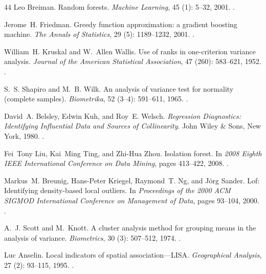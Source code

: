 \documentclass[11pt, letterpaper]{article}
\begin{document}
\begin{thebibliography}{44}
Leo Breiman.
\newblock Random forests.
\newblock \emph{Machine Learning}, 45 (1): 5--32, 2001.
\newblock {}.

Jerome~H. Friedman.
\newblock Greedy function approximation: a gradient boosting machine.
\newblock \emph{The Annals of Statistics}, 29 (5): 1189--1232, 2001.
\newblock {}.

William~H. Kruskal and W.~Allen Wallis.
\newblock Use of ranks in one-criterion variance analysis.
\newblock \emph{Journal of the American Statistical Association}, 47 (260): 583--621, 1952.
\newblock {}.

S.~S. Shapiro and M.~B. Wilk.
\newblock An analysis of variance test for normality (complete samples).
\newblock \emph{Biometrika}, 52 (3--4): 591--611, 1965.
\newblock {}.

David~A. Belsley, Edwin Kuh, and Roy~E. Welsch.
\newblock \emph{Regression Diagnostics: Identifying Influential Data and Sources of Collinearity}.
\newblock John Wiley \& Sons, New York, 1980.
\newblock {}.

Fei~Tony Liu, Kai~Ming Ting, and Zhi-Hua Zhou.
\newblock Isolation forest.
\newblock In \emph{2008 Eighth IEEE International Conference on Data Mining}, pages 413--422, 2008.
\newblock {}.

Markus~M. Breunig, Hans-Peter Kriegel, Raymond~T. Ng, and J{\"o}rg Sander.
\newblock Lof: Identifying density-based local outliers.
\newblock In \emph{Proceedings of the 2000 ACM SIGMOD International Conference on Management of Data}, pages 93--104, 2000.
\newblock {}.

A.~J. Scott and M.~Knott.
\newblock A cluster analysis method for grouping means in the analysis of variance.
\newblock \emph{Biometrics}, 30 (3): 507--512, 1974.
\newblock {}.

Luc Anselin.
\newblock Local indicators of spatial association---{LISA}.
\newblock \emph{Geographical Analysis}, 27 (2): 93--115, 1995.
\newblock {}.


\end{thebibliography}
\end{document}
